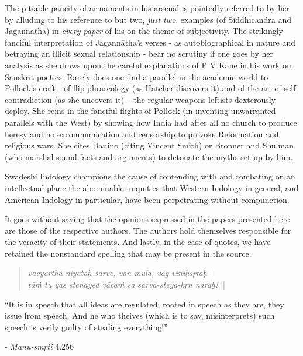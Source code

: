 The pitiable paucity of armaments in his arsenal is pointedly referred to by her by alluding to his reference to but two, {\sl just two}, examples (of Siddhicandra and Jagannātha) in {\sl every paper} of his on the theme of subjectivity. The strikingly fanciful interpretation of Jagannātha’s verses - as autobiographical in nature and betraying an illicit sexual relationship - bear no scrutiny if one goes by her analysis as she draws upon the careful explanations of P V Kane in his work on Sanskrit poetics. Rarely does one find a parallel in the academic world to Pollock’s craft - of flip phraseology (as Hatcher discovers it) and of the art of self-contradiction (as she uncovers it) -- the regular weapons leftists dexterously deploy. She reins in the fanciful flights of Pollock (in inventing unwarranted parallels with the West) by showing how India had after all no church to produce heresy and no excommunication and censorship to provoke Reformation and religious wars. She cites Danino (citing Vincent Smith) or Bronner and Shulman (who marshal sound facts and arguments) to detonate the myths set up by him. 

Swadeshi Indology champions the cause of contending with and combating on an intellectual plane the abominable iniquities that Western Indology in general, and American Indology in particular, have been perpetrating without compunction.

It goes without saying that the opinions expressed in the papers presented here are those of the respective authors. The authors hold themselves responsible for the veracity of their statements. And lastly, in the case of quotes, we have retained the nonstandard spelling that may be present in the source.

\begin{quote}
{{\sl vācyarthā niyatāḥ sarve, vāṅ-mūlā, vāg-viniḥsṛtāḥ}} |\\
{\sl tāṁ tu yas stenayed vācaṁ sa sarva-steya-kṛn naraḥ!} ||
\end{quote}

\begin{center}
“It is in speech that all ideas are regulated; rooted in speech as they are, they issue from speech. And he who theives (which is to say, misinterprets) such speech is verily guilty of stealing everything!”
\end{center}

\noindent
\hfill	- {\sl Manu-smṛti} 4.256\qquad\,

